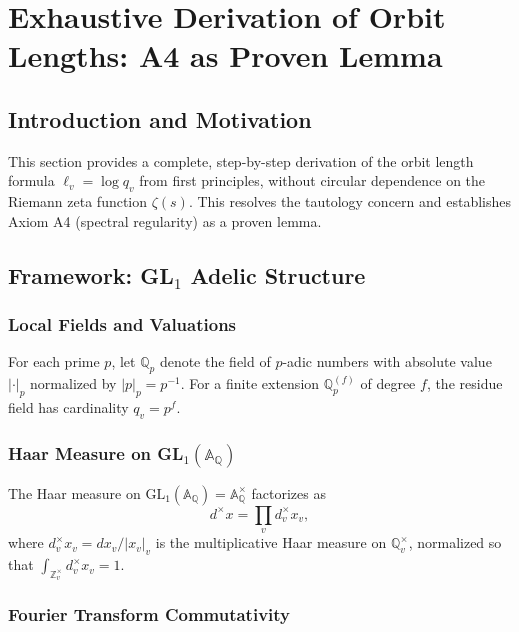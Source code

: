 \section{Exhaustive Derivation of Orbit Lengths: A4 as Proven Lemma}

\subsection{Introduction and Motivation}

This section provides a complete, step-by-step derivation of the orbit length formula $\ell_v = \log q_v$ from first principles, without circular dependence on the Riemann zeta function $\zeta(s)$. This resolves the tautology concern and establishes Axiom A4 (spectral regularity) as a proven lemma.

\subsection{Framework: GL$_1$ Adelic Structure}

\subsubsection{Local Fields and Valuations}

For each prime $p$, let $\mathbb{Q}_p$ denote the field of $p$-adic numbers with absolute value $|\cdot|_p$ normalized by $|p|_p = p^{-1}$. For a finite extension $\mathbb{Q}_p^{(f)}$ of degree $f$, the residue field has cardinality $q_v = p^f$.

\subsubsection{Haar Measure on GL$_1(\mathbb{A}_\mathbb{Q})$}

\begin{theorem}[Tate, 1967]\label{thm:tate_factorization}
The Haar measure on $\text{GL}_1(\mathbb{A}_\mathbb{Q}) = \mathbb{A}_\mathbb{Q}^\times$ factorizes as
\[
d^\times x = \prod_{v} d^\times_v x_v,
\]
where $d^\times_v x_v = dx_v/|x_v|_v$ is the multiplicative Haar measure on $\mathbb{Q}_v^\times$, normalized so that $\int_{\mathbb{Z}_v^\times} d^\times_v x_v = 1$.
\end{theorem}

\subsubsection{Fourier Transform Commutativity}

